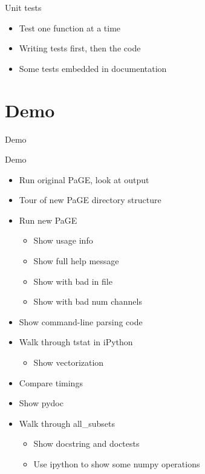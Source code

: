 \documentclass{beamer}
\begin{document}
\begin{frame}{Unit tests}
  \begin{itemize}
  \item Test one function at a time
  \item Writing tests first, then the code
  \item Some tests embedded in documentation
  \end{itemize}  
\end{frame}

\section{Demo}
\begin{frame}
  \begin{centering}
    \Large{Demo}        
  \end{centering}
\end{frame}

\begin{frame}{Demo}
  \begin{itemize}
  \item Run original PaGE, look at output
  \item Tour of new PaGE directory structure

  \item Run new PaGE
    \begin{itemize}
    \item Show usage info
    \item Show full help message
    \item Show with bad in file
    \item Show with bad num channels
    \end{itemize}

  \item Show command-line parsing code

  \item Walk through tstat in iPython
    \begin{itemize}
    \item Show vectorization
    \end{itemize}

  \item Compare timings

  \item Show pydoc

  \item Walk through all\_subsets
    \begin{itemize}
    \item Show docstring and doctests
    \item Use ipython to show some numpy operations
    \end{itemize}
  \end{itemize}
\end{frame}
\end{document}
